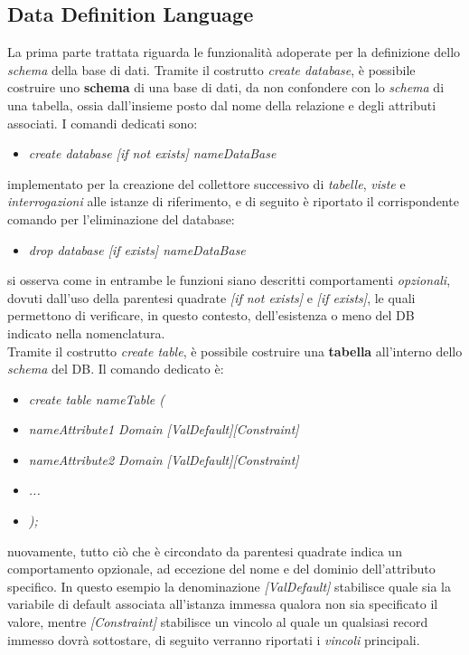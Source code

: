 \documentclass{article}
\begin{document}
\subsection*{Data Definition Language}
\large
La prima parte trattata riguarda le funzionalità adoperate per la definizione dello \textit{schema} della base di dati. Tramite il costrutto \textit{create database}, è possibile costruire uno \textbf{schema} di una base di dati, da non confondere con lo \textit{schema} di una tabella, ossia dall'insieme posto dal nome della relazione e degli attributi associati. I comandi dedicati sono:\vspace*{7pt}
\begin{itemize}[label={ }, leftmargin=1cm]
    \item \textit{create database [if not exists] nameDataBase}
\end{itemize}
implementato per la creazione del collettore successivo di \textit{tabelle}, \textit{viste} e \textit{interrogazioni} alle istanze di riferimento, e di seguito è riportato il corrispondente comando per l'eliminazione del database:
\begin{itemize}[label={ }, leftmargin=1cm]
    \item \textit{drop database [if exists] nameDataBase}
\end{itemize}
si osserva come in entrambe le funzioni siano descritti comportamenti \textit{opzionali}, dovuti dall'uso della parentesi quadrate \textit{[if not exists]} e \textit{[if exists]}, le quali permettono di verificare, in questo contesto, dell'esistenza o meno del DB indicato nella nomenclatura.\vspace*{14pt}\\
Tramite il costrutto \textit{create table}, è possibile costruire una \textbf{tabella} all'interno dello \textit{schema} del DB. Il comando dedicato è:
\begin{itemize}[label={ }, leftmargin=1cm]
    \item \textit{create table nameTable (}
\end{itemize}
\begin{itemize}[label={ }, leftmargin=2cm]
    \itemsep0em
    \item \textit{nameAttribute1 Domain [ValDefault][Constraint]} 
    \item \textit{nameAttribute2 Domain [ValDefault][Constraint]}
    \item \textit{...} 
\end{itemize}
\begin{itemize}[label={ }, leftmargin=1cm] 
    \item \textit{);}
\end{itemize}
nuovamente, tutto ciò che è circondato da parentesi quadrate indica un comportamento opzionale, ad eccezione del nome e del dominio dell'attributo specifico. In questo esempio la denominazione \textit{[ValDefault]} stabilisce quale sia la variabile di default associata all'istanza immessa qualora non sia specificato il valore, mentre \textit{[Constraint]} stabilisce un vincolo al quale un qualsiasi record immesso dovrà sottostare, di seguito verranno riportati i \textit{vincoli} principali.
\end{document}

